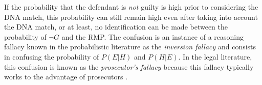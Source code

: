 \documentclass[10pt]{article}
\begin{document}
If the probability that the defendant is \textit{not} guilty is high prior 
to considering the DNA match, this probability can still remain  
high even after taking into account the DNA match, or at least, 
no identification can be made between the probability 
of $\neg G$ and the RMP. %
The confusion is an instance of a reasoning fallacy known in the probabilistic 
literature as the \textit{inversion fallacy} and consists in confusing the probability of
$P(E|H)$ and $P(H|E)$. In the legal literature, this confusion is known as the \textit{prosecutor's fallacy} because this fallacy typically works to 
the advantage of prosecutors \citep{Thompson1987Interpretation}.  


\begin{comment}


\end{comment}
\end{document}
